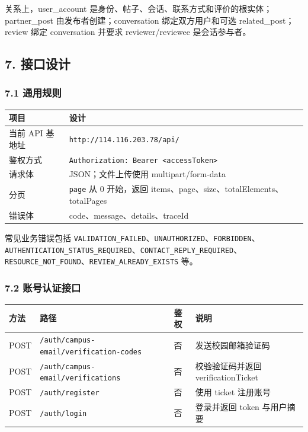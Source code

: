 \documentclass[
]{ctexart}
\begin{document}
关系上，user\_account
是身份、帖子、会话、联系方式和评价的根实体；partner\_post
由发布者创建；conversation 绑定双方用户和可选 related\_post；review 绑定
conversation 并要求 reviewer/reviewee 是会话参与者。

\hypertarget{ux63a5ux53e3ux8bbeux8ba1}{%
\subsection{7. 接口设计}\label{ux63a5ux53e3ux8bbeux8ba1}}

\hypertarget{ux901aux7528ux89c4ux5219}{%
\subsubsection{7.1 通用规则}\label{ux901aux7528ux89c4ux5219}}

\begin{longtable}[]{@{}ll@{}}
\toprule
项目 & 设计 \\
\midrule
\endhead
当前 API 基地址 & \texttt{http://114.116.203.78/api/} \\
鉴权方式 &
\texttt{Authorization:\ Bearer\ \textless{}accessToken\textgreater{}} \\
请求体 & JSON；文件上传使用 multipart/form-data \\
分页 & \texttt{page} 从 0 开始，返回
items、page、size、totalElements、totalPages \\
错误体 & code、message、details、traceId \\
\bottomrule
\end{longtable}

常见业务错误包括
\texttt{VALIDATION\_FAILED}、\texttt{UNAUTHORIZED}、\texttt{FORBIDDEN}、\texttt{AUTHENTICATION\_STATUS\_REQUIRED}、\texttt{CONTACT\_REPLY\_REQUIRED}、\texttt{RESOURCE\_NOT\_FOUND}、\texttt{REVIEW\_ALREADY\_EXISTS}
等。

\hypertarget{ux8d26ux53f7ux8ba4ux8bc1ux63a5ux53e3}{%
\subsubsection{7.2
账号认证接口}\label{ux8d26ux53f7ux8ba4ux8bc1ux63a5ux53e3}}

\begin{longtable}[]{@{}llll@{}}
\toprule
方法 & 路径 & 鉴权 & 说明 \\
\midrule
\endhead
POST & \texttt{/auth/campus-email/verification-codes} & 否 &
发送校园邮箱验证码 \\
POST & \texttt{/auth/campus-email/verifications} & 否 & 校验验证码并返回
verificationTicket \\
POST & \texttt{/auth/register} & 否 & 使用 ticket 注册账号 \\
POST & \texttt{/auth/login} & 否 & 登录并返回 token 与用户摘要 \\
\bottomrule
\end{longtable}
\end{document}
